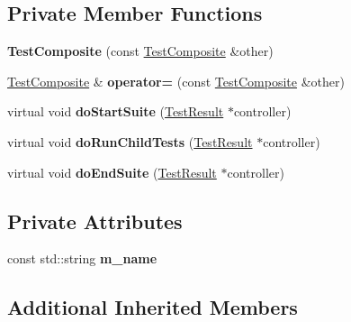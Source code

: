 \subsection*{Private Member Functions}
\begin{DoxyCompactItemize}
\item 
{\bfseries Test\+Composite} (const \hyperlink{class_test_composite}{Test\+Composite} \&other)\hypertarget{class_test_composite_a767940bd73f3f7b06f26d547181478e7}{}\label{class_test_composite_a767940bd73f3f7b06f26d547181478e7}

\item 
\hyperlink{class_test_composite}{Test\+Composite} \& {\bfseries operator=} (const \hyperlink{class_test_composite}{Test\+Composite} \&other)\hypertarget{class_test_composite_a1ce0651593d6887aaefff6a74563ed6d}{}\label{class_test_composite_a1ce0651593d6887aaefff6a74563ed6d}

\item 
virtual void {\bfseries do\+Start\+Suite} (\hyperlink{class_test_result}{Test\+Result} $\ast$controller)\hypertarget{class_test_composite_a5fefb56f31083baf531ed57370e51863}{}\label{class_test_composite_a5fefb56f31083baf531ed57370e51863}

\item 
virtual void {\bfseries do\+Run\+Child\+Tests} (\hyperlink{class_test_result}{Test\+Result} $\ast$controller)\hypertarget{class_test_composite_a23372d24b7b3192c7cdf7b197bb20e59}{}\label{class_test_composite_a23372d24b7b3192c7cdf7b197bb20e59}

\item 
virtual void {\bfseries do\+End\+Suite} (\hyperlink{class_test_result}{Test\+Result} $\ast$controller)\hypertarget{class_test_composite_ae188a1ce0f75ead68e1701ede03d01eb}{}\label{class_test_composite_ae188a1ce0f75ead68e1701ede03d01eb}

\end{DoxyCompactItemize}
\subsection*{Private Attributes}
\begin{DoxyCompactItemize}
\item 
const std\+::string {\bfseries m\+\_\+name}\hypertarget{class_test_composite_a59ca41ced376ba57e5e16a432ba8cab8}{}\label{class_test_composite_a59ca41ced376ba57e5e16a432ba8cab8}

\end{DoxyCompactItemize}
\subsection*{Additional Inherited Members}


